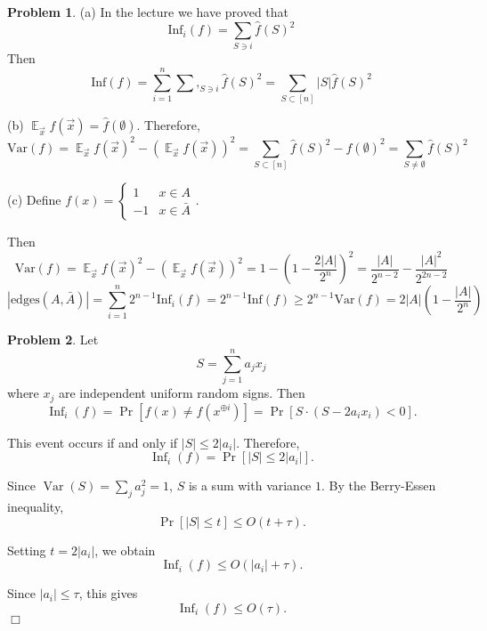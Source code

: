 \documentclass[a4paper]{article}
\theoremstyle{definition}
\newtheorem{problem}{Problem}
\theoremstyle{plain}
\newcommand{\Ebb}{\mathop\mathbb E}
\newcommand{\dps}{\displaystyle}
\newcommand{\<}{\left<}
\renewcommand{\>}{\right>}
\renewcommand{\Ebb}{\mathop\mathbb{E}}
\numberwithin{equation}{problem}
\begin{document}
\newcommand{\Inf}{\mathrm{Inf}}
\begin{problem}
    (a) In the lecture we have proved that 
    \[\Inf_i(f)=\sum_{S\ni i}\hat{f}(S)^2\]
    Then 
    \[\Inf(f)=\sum_{i=1}^n\sum,_{S\ni i}\hat{f}(S)^2=\sum_{S\subset [n]}|S|\hat{f}(S)^2\]


    (b)  $ \Ebb_{\vec{x}}f(\vec{x})=\hat{f}(\emptyset) $. Therefore, 
    \[\mathrm{Var}(f)=\Ebb_{\vec{x}}f(\vec{x})^2-\left(\Ebb_{\vec{x}}f(\vec{x})\right)^2=\sum_{S\subset [n]}\hat{f}(S)^2-\hat{f}(\emptyset)^2=\sum_{S\neq \emptyset}\hat{f}(S)^2\] 

    (c) Define  $ f(x)=\begin{cases}
        1&x\in A\\
        -1&x\in \bar{A}
    \end{cases} $. 

    Then  \[\dps\mathrm{Var}(f)=\Ebb_{\vec{x}}f(\vec{x})^2-\left(\Ebb_{\vec{x}}f(\vec{x})\right)^2=1-\left(1-\frac{2|A|}{2^n}\right)^2=\frac{|A|}{2^{n-2}}-\frac{|A|^2}{2^{2n-2}}\]
    \[|\mathrm{edges}(A,\bar{A})|=\sum_{i=1}^n 2^{n-1}\Inf_i(f)=2^{n-1}\Inf(f) \geq 2^{n-1}\mathrm{Var}(f)=2|A|(1-\frac{|A|}{2^{n}})\]
\end{problem}

\begin{problem}
    Let
\[
S = \sum_{j=1}^n a_j x_j
\]
where $x_j$ are independent uniform random signs. Then
\[
\operatorname{Inf}_i(f) = \Pr\left[ f(x) \neq f(x^{\oplus i}) \right] = \Pr\left[ S \cdot (S - 2 a_i x_i ) < 0 \right].
\]

This event occurs if and only if $|S| \le 2 |a_i|$. Therefore,
\[
\operatorname{Inf}_i(f) = \Pr\left[ |S| \le 2 |a_i| \right].
\]

Since $\operatorname{Var}(S) = \sum_j a_j^2 = 1$, $S$ is a sum with variance $1$. By the Berry-Essen inequality,
\[
\Pr\left[ |S| \le t \right] \le O\left( t + \tau \right).
\]

Setting $t = 2 |a_i|$, we obtain
\[
\operatorname{Inf}_i(f) \le O\left( |a_i| + \tau \right).
\]

Since $|a_i| \le \tau$, this gives
\[
\operatorname{Inf}_i(f) \le O(\tau).
\]
\hfill $\Box$
\end{problem}
\end{document}
